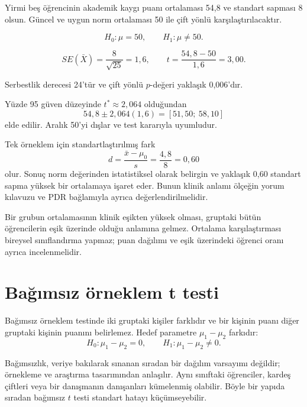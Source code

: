 Yirmi beş öğrencinin akademik kaygı puanı ortalaması 54,8 ve standart sapması
8 olsun. Güncel ve uygun norm ortalaması 50 ile çift yönlü karşılaştırılacaktır.

\[
H_0:\mu=50,
\qquad H_1:\mu\neq50.
\]

\[
SE(\bar X)=\frac{8}{\sqrt{25}}=1{,}6,
\qquad
t=\frac{54{,}8-50}{1{,}6}=3{,}00.
\]

Serbestlik derecesi 24'tür ve çift yönlü $p$-değeri yaklaşık 0,006'dır.


Yüzde 95 güven düzeyinde $t^*\approx2{,}064$ olduğundan
\[
54{,}8\pm2{,}064(1{,}6)
=[51{,}50;\ 58{,}10]
\]
elde edilir. Aralık 50'yi dışlar ve test kararıyla uyumludur.


Tek örneklem için standartlaştırılmış fark
\[
d=\frac{\bar x-\mu_0}{s}
=\frac{4{,}8}{8}=0{,}60
\]
olur. Sonuç norm değerinden istatistiksel olarak belirgin ve yaklaşık 0,60
standart sapma yüksek bir ortalamaya işaret eder. Bunun klinik anlamı ölçeğin
yorum kılavuzu ve PDR bağlamıyla ayrıca değerlendirilmelidir.

\begin{researchbox}
Bir grubun ortalamasının klinik eşikten yüksek olması, gruptaki bütün
öğrencilerin eşik üzerinde olduğu anlamına gelmez. Ortalama karşılaştırması
bireysel sınıflandırma yapmaz; puan dağılımı ve eşik üzerindeki öğrenci oranı
ayrıca incelenmelidir.
\end{researchbox}

\section{Bağımsız örneklem t testi}

Bağımsız örneklem testinde iki gruptaki kişiler farklıdır ve bir kişinin
puanı diğer gruptaki kişinin puanını belirlemez. Hedef parametre
$\mu_1-\mu_2$ farkıdır:
\[
H_0:\mu_1-\mu_2=0,
\qquad
H_1:\mu_1-\mu_2\neq0.
\]

Bağımsızlık, veriye bakılarak sınanan sıradan bir dağılım varsayımı değildir;
örnekleme ve araştırma tasarımından anlaşılır. Aynı sınıftaki öğrenciler,
kardeş çiftleri veya bir danışmanın danışanları kümelenmiş olabilir. Böyle bir
yapıda sıradan bağımsız $t$ testi standart hatayı küçümseyebilir.

